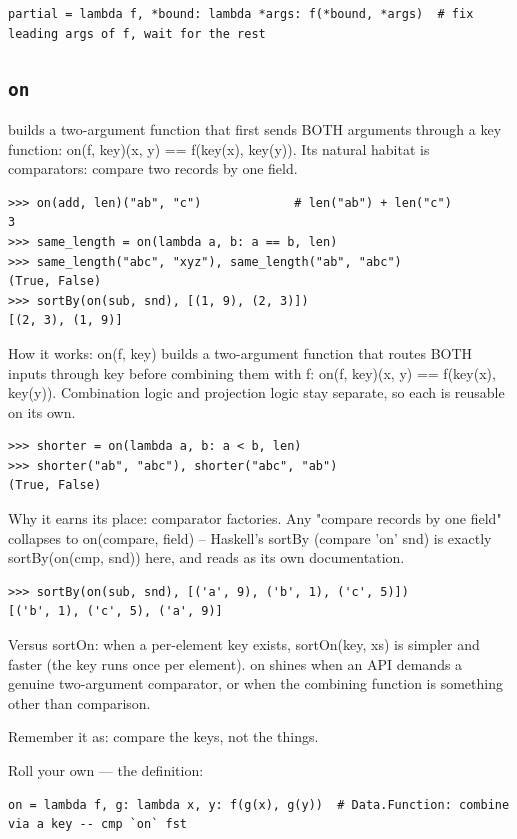 \documentclass[10pt,letterpaper]{book}
\begin{document}
\begin{lstlisting}[style=ex]
partial = lambda f, *bound: lambda *args: f(*bound, *args)  # fix leading args of f, wait for the rest
\end{lstlisting}
\subsection{\texttt{on}}\label{def:on}
builds a two-argument function that first sends BOTH arguments through a key function: on(f, key)(x, y) == f(key(x), key(y)). Its natural habitat is comparators: compare two records by one field.
\begin{lstlisting}[style=ex]
>>> on(add, len)("ab", "c")             # len("ab") + len("c")
3
>>> same_length = on(lambda a, b: a == b, len)
>>> same_length("abc", "xyz"), same_length("ab", "abc")
(True, False)
>>> sortBy(on(sub, snd), [(1, 9), (2, 3)])
[(2, 3), (1, 9)]
\end{lstlisting}

How it works: on(f, key) builds a two-argument function that routes BOTH inputs through key before combining them with f: on(f, key)(x, y) == f(key(x), key(y)). Combination logic and projection logic stay separate, so each is reusable on its own.

\begin{lstlisting}[style=ex]
>>> shorter = on(lambda a, b: a < b, len)
>>> shorter("ab", "abc"), shorter("abc", "ab")
(True, False)
\end{lstlisting}

Why it earns its place: comparator factories. Any "compare records by one field" collapses to on(compare, field) -- Haskell's sortBy (compare 'on' snd) is exactly sortBy(on(cmp, snd)) here, and reads as its own documentation.

\begin{lstlisting}[style=ex]
>>> sortBy(on(sub, snd), [('a', 9), ('b', 1), ('c', 5)])
[('b', 1), ('c', 5), ('a', 9)]
\end{lstlisting}

Versus sortOn: when a per-element key exists, sortOn(key, xs) is simpler and faster (the key runs once per element). on shines when an API demands a genuine two-argument comparator, or when the combining function is something other than comparison.


Remember it as: compare the keys, not the things.


Roll your own --- the definition:

\begin{lstlisting}[style=ex]
on = lambda f, g: lambda x, y: f(g(x), g(y))  # Data.Function: combine via a key -- cmp `on` fst
\end{lstlisting}
\end{document}

